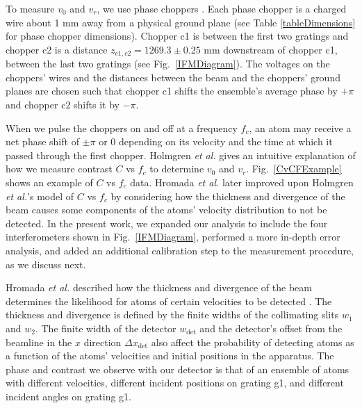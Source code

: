 \documentclass[twocolumn,prl,showpacs,superscriptaddress,longbibliography]{revtex4-1}   %
\newcommand{\figref}[1]{Fig.~\ref{#1}}
\newcommand{\etal}{\textit{et al.}}
\newcommand{\etalspace}{\textit{et al. }}
\begin{document}
To measure $v_0$ and $v_r$, we use phase choppers \cite{Holmgren2011,Hromada2014}. Each phase chopper is a charged wire about 1 mm away from a physical ground plane (see Table \ref{tableDimensions} for phase chopper dimensions). Chopper c1 is between the first two gratings and chopper c2 is a distance $z_{c1,c2} = 1269.3 \pm 0.25$ mm downstream of chopper c1, between the last two gratings (see \figref{IFMDiagram}). The voltages on the choppers' wires and the distances between the beam and the choppers' ground planes are chosen such that chopper c1 shifts the ensemble's average phase by $+\pi$ and chopper c2 shifts it by $-\pi$. 

When we pulse the choppers on and off at a frequency $f_c$, an atom may receive a net phase shift of $\pm\pi$ or $0$ depending on its velocity and the time at which it passed through the first chopper. 
Holmgren \etalspace \cite{Holmgren2011} gives an intuitive explanation of how
we measure contrast $C$ vs $f_c$ to determine $v_0$ and $v_r$. \figref{CvCFExample} shows an example of $C$ vs $f_c$ data. Hromada \etalspace \cite{Hromada2014} later improved upon Holmgren \etal's model of $C$ vs $f_c$ by considering how the thickness and divergence of the beam causes some components of the atoms' velocity distribution to not be detected. In the present work,
we expanded our analysis to include the four interferometers shown in \figref{IFMDiagram}, performed a more in-depth error analysis,
and added an additional calibration step to the measurement procedure, as we discuss next.



Hromada \etalspace described how the thickness and divergence of the beam determines the likelihood for atoms of certain velocities to be detected \cite{Hromada2014}.
The thickness and divergence is defined by the finite widths of the collimating slits $w_1$ and $w_2$. The finite width of the detector $w_{\mathrm{det}}$ and the detector's offset from the beamline in the $x$ direction $\Delta x_{\mathrm{det}}$ also 
affect the probability of detecting atoms as a function of the atoms' velocities and initial positions in the apparatus.
The phase and contrast we observe with our detector is that of an ensemble of atoms with different velocities, different incident positions on grating g1, and different incident angles on grating g1.
\end{document}

